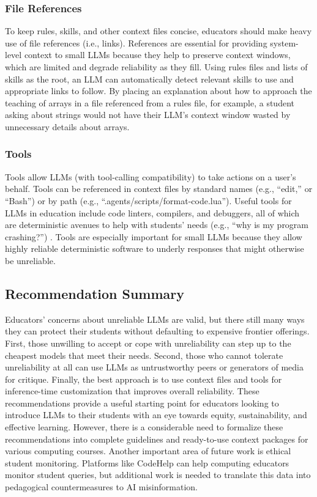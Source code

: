 \subsubsection{File References}\label{file-references}

To keep rules, skills, and other context files concise, educators should make heavy use of file references (i.e., links). References are essential for providing system-level context to small LLMs because they help to preserve context windows, which are limited and degrade reliability as they fill. Using rules files and lists of skills as the root, an LLM can automatically detect relevant skills to use and appropriate links to follow. By placing an explanation about how to approach the teaching of arrays in a file referenced from a rules file, for example, a student asking about strings would not have their LLM's context window wasted by unnecessary details about arrays.

\subsubsection{Tools}\label{tools}

Tools allow LLMs (with tool-calling compatibility) to take actions on a user's behalf. Tools can be referenced in context files by standard names (e.g., ``edit,'' or ``Bash'') or by path (e.g., ``.agents/scripts/format-code.lua''). Useful tools for LLMs in education include code linters, compilers, and debuggers, all of which are deterministic avenues to help with students' needs (e.g., ``why is my program crashing?'') \cite{solanoFineTuningOpenSourceModels2026}. Tools are especially important for small LLMs because they allow highly reliable deterministic software to underly responses that might otherwise be unreliable.

\subsection{Recommendation Summary}\label{recommendation-summary}

Educators' concerns about unreliable LLMs are valid, but there still many ways they can protect their students without defaulting to expensive frontier offerings. First, those unwilling to accept or cope with unreliability can step up to the cheapest models that meet their needs. Second, those who cannot tolerate unreliability at all can use LLMs as untrustworthy peers or generators of media for critique. Finally, the best approach is to use context files and tools for inference-time customization that improves overall reliability. These recommendations provide a useful starting point for educators looking to introduce LLMs to their students with an eye towards equity, sustainability, and effective learning. However, there is a considerable need to formalize these recommendations into complete guidelines and ready-to-use context packages for various computing courses. Another important area of future work is ethical student monitoring. Platforms like CodeHelp \cite{liffitonCodeHelpUsingLarge2023} can help computing educators monitor student queries, but additional work is needed to translate this data into pedagogical countermeasures to AI misinformation.

